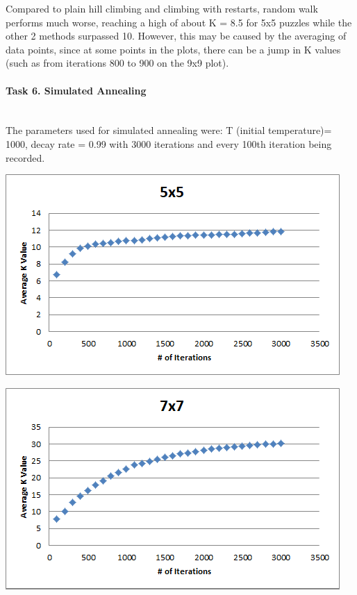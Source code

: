 \documentclass[12pt, letterpaper]{article}
\begin{document}
Compared to plain hill climbing and climbing with restarts, random walk performs much worse, reaching a high of about K = 8.5 for 5x5 puzzles while the other 2 methods surpassed 10. However, this may be caused by the averaging of data points, since at some points in the plots, there can be a jump in K values (such as from iterations 800 to 900 on the 9x9 plot).

\pagebreak
\paragraph{Task 6. Simulated Annealing} \mbox{}\\

The parameters used for simulated annealing were: T (initial temperature)= 1000, decay rate = 0.99 with 3000 iterations and every 100th iteration being recorded.

\includegraphics[width=\linewidth]{"Task 6/5x5 Scatterplot"}

\includegraphics[width=\linewidth]{"Task 6/7x7 Scatterplot"}
\end{document}
